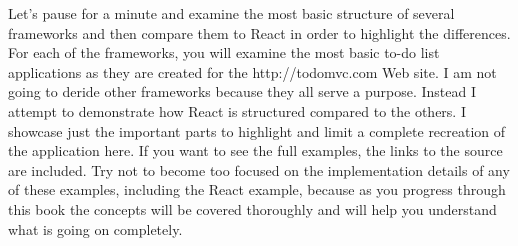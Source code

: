 Let’s pause for a minute and examine the most basic structure of several frameworks and then compare them to React in order to highlight the differences. For each of the frameworks, you will examine the most basic to-do list applications as they are created for the http://todomvc.com Web site. I am not going to deride other frameworks because they all serve a purpose. Instead I attempt to demonstrate how React is structured compared to the others. I showcase just the important parts to highlight and limit a complete recreation of the application here. If you want to see the full examples, the links to the source are included. Try not to become too focused on the implementation details of any of these examples, including the React example, because as you progress through this book the concepts will be covered thoroughly and will help you understand what is going on completely.